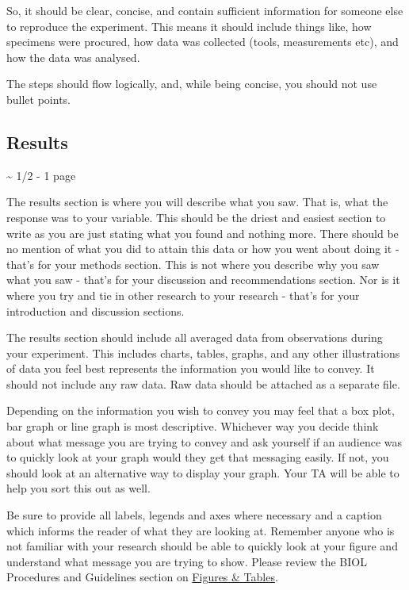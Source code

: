 \documentclass[
]{book}
\begin{document}
So, it should be clear, concise, and contain sufficient information for someone else to reproduce the experiment. This means it should include things like, how specimens were procured, how data was collected (tools, measurements etc), and how the data was analysed.

The steps should flow logically, and, while being concise, you should not use bullet points.

\hypertarget{results}{%
\subsection*{Results}\label{results}}

\textasciitilde{} 1/2 - 1 page

The results section is where you will describe what you saw. That is, what the response was to your variable. This should be the driest and easiest section to write as you are just stating what you found and nothing more. There should be no mention of what you did to attain this data or how you went about doing it - that's for your methods section. This is not where you describe why you saw what you saw - that's for your discussion and recommendations section. Nor is it where you try and tie in other research to your research - that's for your introduction and discussion sections.

The results section should include all averaged data from observations during your experiment. This includes charts, tables, graphs, and any other illustrations of data you feel best represents the information you would like to convey. It should not include any raw data. Raw data should be attached as a separate file.

Depending on the information you wish to convey you may feel that a box plot, bar graph or line graph is most descriptive. Whichever way you decide think about what message you are trying to convey and ask yourself if an audience was to quickly look at your graph would they get that messaging easily. If not, you should look at an alternative way to display your graph. Your TA will be able to help you sort this out as well.

Be sure to provide all labels, legends and axes where necessary and a caption which informs the reader of what they are looking at. Remember anyone who is not familiar with your research should be able to quickly look at your figure and understand what message you are trying to show. Please review the BIOL Procedures and Guidelines section on \href{https://ubco-biology.github.io/Procedures-and-Guidelines/figures-tables.html}{Figures \& Tables}.
\end{document}
